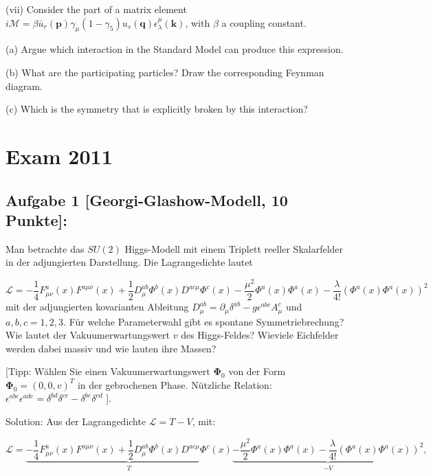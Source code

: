 \documentclass[10pt, letterpaper]{article}
\begin{document}
(vii) Consider the part of a matrix element $i \mathcal{M}=\beta \bar{u}_r(\mathbf{p}) \gamma_\mu\left(1-\gamma_5\right) u_s(\mathbf{q}) \epsilon_\lambda^\mu(\mathbf{k})$, with $\beta$ a coupling constant.

(a) Argue which interaction in the Standard Model can produce this expression.

(b) What are the participating particles? Draw the corresponding Feynman diagram.

(c) Which is the symmetry that is explicitly broken by this interaction?



\pagebreak


\section{Exam 2011}


\subsection{Aufgabe 1 [Georgi-Glashow-Modell, 10 Punkte]:}

Man betrachte das $S U(2)$ Higgs-Modell mit einem Triplett reeller Skalarfelder in der adjungierten Darstellung. Die Lagrangedichte lautet

$$
\mathcal{L}=-\frac{1}{4} F_{\mu \nu}^a(x) F^{a \mu \nu}(x)+\frac{1}{2} D_\mu^{a b} \Phi^b(x) D^{a c \mu} \Phi^c(x)-\frac{\mu^2}{2} \Phi^a(x) \Phi^a(x)-\frac{\lambda}{4!}\left(\Phi^a(x) \Phi^a(x)\right)^2
$$
mit der adjungierten kovarianten Ableitung $D_\mu^{a b}=\partial_\mu \delta^{a b}-g \epsilon^{a b c} A_\mu^c$ und $a, b, c=1,2,3$. Für welche Parameterwahl gibt es spontane Symmetriebrechung? Wie lautet der Vakuumerwartungswert $v$ des Higgs-Feldes? Wieviele Eichfelder werden dabei massiv und wie lauten ihre Massen?

[Tipp: Wählen Sie einen Vakuumerwartungswert $\mathbf{\Phi}_0$ von der Form $\mathbf{\Phi}_0=(0,0, v)^T$ in der gebrochenen Phase. Nützliche Relation: $\epsilon^{a b c} \epsilon^{a d e}=\delta^{b d} \delta^{c e}-\delta^{b e} \delta^{c d}$ ].



Solution: Aus der Lagrangedichte $\mathcal{L}=T-V$, mit:

$$
\mathcal{L}=\underbrace{-\frac{1}{4} F_{\mu \nu}^a(x) F^{a \mu \nu}(x)+\frac{1}{2} D_\mu^{a b} \Phi^b(x) D^{a c \mu} \Phi^c(x)}_T \underbrace{-\frac{\mu^2}{2} \Phi^a(x) \Phi^a(x)-\frac{\lambda}{4!}\left(\Phi^a(x) \Phi^a(x)\right)^2}_{-V},
$$
\end{document}
